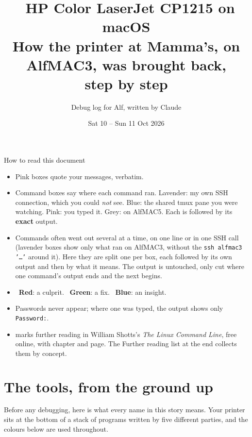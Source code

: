 \documentclass[11pt,a4paper]{article}
\title{\emo{printer}\ HP Color LaserJet CP1215 on macOS\\[0.3em]
  \large How the printer at Mamma's, on AlfMAC3, was brought back,\\ step by step}
\author{Debug log for Alf, written by Claude}
\date{Sat 10 -- Sun 11 Oct 2026}
\newcommand{\bugemo}{\texttwemoji{lady beetle}}
\newcommand{\swatch}[2]{{\setlength{\fboxsep}{1pt}\colorbox{#1}{\hspace{2pt}#2\hspace{2pt}}}}
\begin{document}
\maketitle

\begin{insight}{How to read this document}
\begin{itemize}[nosep]
  \item \swatch{pink!45}{Pink boxes} quote your messages, verbatim.
  \item Command boxes say where each command ran. \swatch{lavender!30}{Lavender}: my own SSH connection, which you could \emph{not} see. \swatch{blue!15}{Blue}: the shared tmux pane you were watching. \swatch{pink!35}{Pink}: you typed it. \swatch{grey!40}{Grey}: on AlfMAC5. Each is followed by its \textbf{exact} output.
  \item Commands often went out several at a time, on one line or in one SSH call (lavender boxes show only what ran on AlfMAC3, without the \texttt{ssh alfmac3 '\dots'} around it). Here they are split one per box, each followed by its own output and then by what it means. The output is untouched, only cut where one command's output ends and the next begins.
  \item \bugemo\ \textcolor{red!85!black}{\textbf{Red}}: a culprit. \ \textcolor{green!45!black}{\textbf{Green}}: a fix. \ \textcolor{blue!60!black}{\textbf{Blue}}: an insight.
  \item Passwords never appear; where one was typed, the output shows only \texttt{Password:}.
  \item \cite{shotts} marks further reading in William Shotts's \textit{The Linux Command Line}, free online, with chapter and page. The Further reading list at the end collects them by concept.
\end{itemize}
\end{insight}

\tableofcontents
\newpage

\section{The tools, from the ground up}

Before any debugging, here is what every name in this story means. Your printer sits at the bottom of a stack of programs written by five different parties, and the colours below are used throughout.
\end{document}
